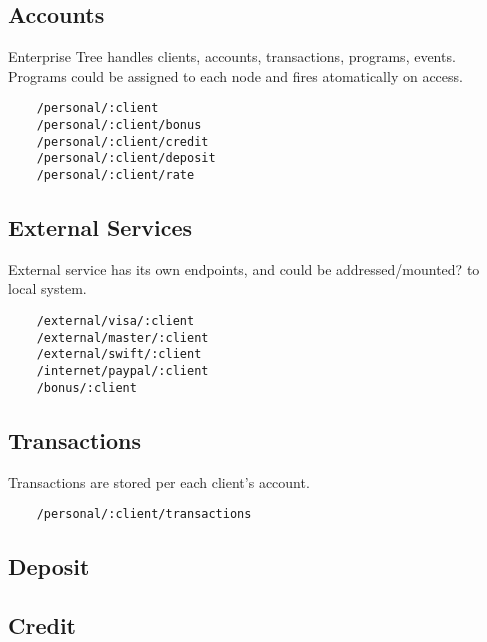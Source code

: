 \subsection{Accounts}

Enterprise Tree handles clients, accounts, transactions, programs, events.
Programs could be assigned to each node and fires atomatically on access.

\vspace{1\baselineskip}
\begin{lstlisting}
    /personal/:client
    /personal/:client/bonus
    /personal/:client/credit
    /personal/:client/deposit
    /personal/:client/rate
\end{lstlisting}
\vspace{1\baselineskip}

\subsection{External Services}

External service has its own endpoints, and could be
addressed/mounted? to local system.

\vspace{1\baselineskip}
\begin{lstlisting}
    /external/visa/:client
    /external/master/:client
    /external/swift/:client
    /internet/paypal/:client
    /bonus/:client
\end{lstlisting}
\vspace{1\baselineskip}

\subsection{Transactions}

Transactions are stored per each client's account.

\vspace{1\baselineskip}
\begin{lstlisting}
    /personal/:client/transactions
\end{lstlisting}
\vspace{1\baselineskip}

\subsection{Deposit}

\subsection{Credit}

